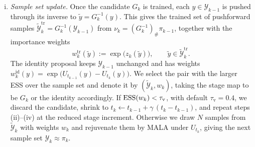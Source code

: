 \documentclass{article}
\begin{document}
\begin{enumerate}[(i)]
\item \emph{Sample set update.} Once the candidate $G_k$ is trained, each $y \in \mathcal Y_{k-1}$ is pushed through its inverse to $\tilde y = G_k^{-1}(y)$. This gives the trained set of pushforward samples $\tilde{\mathcal Y}_k^{\mathrm{tr}} = G_k^{-1}(\mathcal Y_{k-1})$ from $\nu_k = (G_k^{-1})_{\#}\pi_{k-1}$, together with the importance weights
\begin{equation*}
    w_k^{\mathrm{tr}}(\tilde y) := \exp\bigl(z_k(\tilde y)\bigr),
    \qquad \tilde y \in \tilde{\mathcal Y}_k^{\mathrm{tr}} .
\end{equation*}
The identity proposal keeps $\mathcal Y_{k-1}$ unchanged and has weights $w_k^{\mathrm{id}}(y)=\exp\big(U_{t_{k-1}}(y)-U_{t_k}(y)\big)$. We select the pair with the larger ESS over the sample set and denote it by $(\tilde{\mathcal Y}_k,w_k)$, taking the stage map to be $G_k$ or the identity accordingly. If $\mathrm{ESS}(w_k) < \tau_{\mathrm v}$, with default {\color{blue}$\tau_{\mathrm v} = 0.4$}, we discard the candidate, shrink to $t_k \gets t_{k-1} + \gamma\,(t_k - t_{k-1})$, and repeat steps (ii)--(iv) at the reduced stage increment. Otherwise we draw $N$ samples from $\tilde{\mathcal Y}_k$ with weights $w_k$ and rejuvenate them by MALA under $U_{t_k}$, giving the next sample set $\mathcal Y_k\approx\pi_k$.
\end{enumerate}
\end{document}
